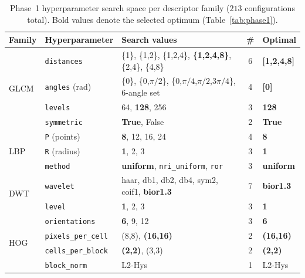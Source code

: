 \begin{table}[!t]
\centering
\caption{Phase~1 hyperparameter search space per descriptor family ($213$ configurations total). Bold values denote the selected optimum (Table~\ref{tab:phase1}).}
\label{tab:descriptor_grids}
\small
\begin{tabular}{@{}p{1.1cm}p{2.2cm}p{5.8cm}cp{2.8cm}@{}}
\toprule
Family & Hyperparameter & Search values & \# & Optimal \\
\midrule
\multirow{4}{*}{GLCM}
 & \texttt{distances} & \{1\}, \{1,2\}, \{1,2,4\}, \textbf{\{1,2,4,8\}}, \{2,4\}, \{4,8\} & 6 & \textbf{[1,2,4,8]} \\
 & \texttt{angles} (rad) & \{0\}, \{0,$\pi/2$\}, \{0,$\pi/4$,$\pi/2$,$3\pi/4$\}, 6-angle set & 4 & \textbf{[0]} \\
 & \texttt{levels} & 64, \textbf{128}, 256 & 3 & \textbf{128} \\
 & \texttt{symmetric} & \textbf{True}, False & 2 & \textbf{True} \\
\midrule
\multirow{3}{*}{LBP}
 & \texttt{P} (points) & \textbf{8}, 12, 16, 24 & 4 & \textbf{8} \\
 & \texttt{R} (radius) & \textbf{1}, 2, 3 & 3 & \textbf{1} \\
 & \texttt{method} & \textbf{uniform}, \texttt{nri\_uniform}, \texttt{ror} & 3 & \textbf{uniform} \\
\midrule
\multirow{2}{*}{DWT}
 & \texttt{wavelet} & haar, db1, db2, db4, sym2, coif1, \textbf{bior1.3} & 7 & \textbf{bior1.3} \\
 & \texttt{level} & \textbf{1}, 2, 3 & 3 & \textbf{1} \\
\midrule
\multirow{4}{*}{HOG}
 & \texttt{orientations} & \textbf{6}, 9, 12 & 3 & \textbf{6} \\
 & \texttt{pixels\_per\_cell} & (8,8), \textbf{(16,16)} & 2 & \textbf{(16,16)} \\
 & \texttt{cells\_per\_block} & \textbf{(2,2)}, (3,3) & 2 & \textbf{(2,2)} \\
 & \texttt{block\_norm} & L2-Hys & 1 & L2-Hys \\
\bottomrule
\end{tabular}
\end{table}
